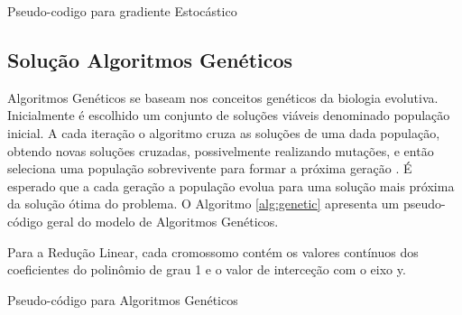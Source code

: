 \documentclass[conference]{IEEEtran}
\begin{document}
\begin{algorithm}
		\caption{Pseudo-codigo para gradiente Estocástico}
		\label{alg:stochastic}
	\end{algorithm}	
	
\subsection{Solução Algoritmos Genéticos}
Algoritmos Genéticos se baseam nos conceitos genéticos da biologia evolutiva. Inicialmente é escolhido um conjunto de soluções viáveis denominado população inicial. A cada iteração o algoritmo cruza as soluções de uma dada população, obtendo novas soluções cruzadas, possivelmente realizando mutações, e então seleciona uma população sobrevivente para formar a próxima geração \cite{gendreau2010handbook}. É esperado que a cada geração a população evolua para uma solução mais próxima da solução ótima do problema. O Algoritmo \ref{alg:genetic} apresenta um pseudo-código geral do modelo de Algoritmos Genéticos.

Para a Redução Linear, cada cromossomo contém os valores contínuos dos coeficientes do polinômio de grau 1 e o valor de interceção com o eixo y. 

		\begin{algorithm}
		\caption{Pseudo-código para Algoritmos Genéticos}
		\label{alg:genetic}
	\end{algorithm}
\end{document}
